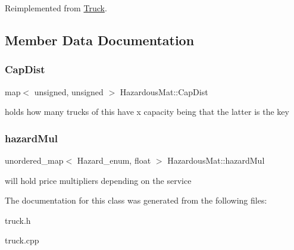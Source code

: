 Reimplemented from \hyperlink{class_truck_a38f09eab2822524e355ecf6d0a13f7de}{Truck}.



\subsection{Member Data Documentation}
\mbox{\label{class_hazardous_mat_a5deebb5a87aa507f2a22065039a3dc2d}} 
\subsubsection{\texorpdfstring{Cap\+Dist}{CapDist}}
{\footnotesize\ttfamily map$<$ unsigned, unsigned $>$ Hazardous\+Mat\+::\+Cap\+Dist\hspace{0.3cm}{\ttfamily [static]}}

holds how many trucks of this have x capacity being that the latter is the key \mbox{\label{class_hazardous_mat_a0d695364bed729ddeca5851314281ad2}} 
\subsubsection{\texorpdfstring{hazard\+Mul}{hazardMul}}
{\footnotesize\ttfamily unordered\+\_\+map$<$ Hazard\+\_\+enum, float $>$ Hazardous\+Mat\+::hazard\+Mul\hspace{0.3cm}{\ttfamily [static]}}

will hold price multipliers depending on the service 

The documentation for this class was generated from the following files\+:\begin{DoxyCompactItemize}
\item 
truck.\+h\item 
truck.\+cpp\end{DoxyCompactItemize}
